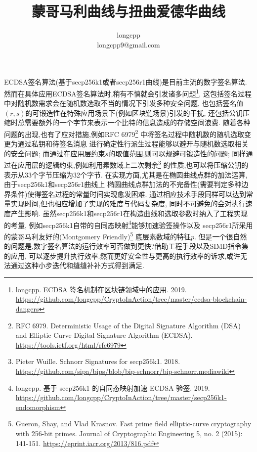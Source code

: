 \documentclass{article}
\begin{document}
\title{蒙哥马利曲线与扭曲爱德华曲线}
\author{longcpp \\ \small{longcpp9@gmail.com}}

\maketitle

ECDSA签名算法(基于secp256k1或者secp256r1曲线)是目前主流的数字签名算法.
然而在具体应用ECDSA签名算法时,稍有不慎就会引发诸多问题\footnote{
longcpp. ECDSA 签名机制在区块链领域中的应⽤. 2019.
\url{https://github.com/longcpp/CryptoInAction/tree/master/ecdsa-blockchain-dangers}},
这包括签名过程中对随机数需求会在随机数选取不当的情况下引发多种安全问题,
也包括签名值$(r,s)$的可锻造性在特殊应用场景下(例如区块链场景)引发的干扰,
还包括公钥压缩时总需要额外的一个字节来表示一个比特的信息造成的存储空间浪费.
随着各种问题的出现,也有了应对措施,例如RFC 6979\footnote{
RFC 6979. 
Deterministic Usage of the Digital Signature Algorithm (DSA) and Elliptic Curve Digital Signature Algorithm (ECDSA).
\url{https://tools.ietf.org/html/rfc6979}}
中将签名过程中随机数的随机选取变更为通过私钥和待签名消息
进行确定性行派生过程能够以避开与随机数选取相关的安全问题;
而通过在应用层约束$s$的取值范围,则可以规避可锻造性的问题;
同样通过在应用层的逻辑约束,例如利用素数域上二次剩余\footnote{
Pieter Wuille. Schnorr Signatures for secp256k1. 2018.
\url{https://github.com/sipa/bips/blob/bip-schnorr/bip-schnorr.mediawiki}}
的性质,也可以将压缩公钥的表示从33个字节压缩为32个字节.
在实现方面,尤其是在椭圆曲线点群的加法运算,由于secp256k1和secp256r1曲线上
椭圆曲线点群加法的不完备性(需要判定多种边界条件)使得签名过程的常量时间实现愈发困难.
通过相应技术手段同样可以达到常量实现时间,但也相应增加了实现的难度与代码复杂度,
同时不可避免的会对执行速度产生影响.
虽然secp256k1和secp256r1在构造曲线和选取参数时纳入了工程实现的考量,
例如secp256k1自带的自同态映射\footnote{
longcpp. 基于 secp256k1 的⾃同态映射加速 ECDSA 验签. 2019.
\url{https://github.com/longcpp/CryptoInAction/tree/master/secp256k1-endomorphism}
}能够加速验签操作以及
secp256r1所采用的蒙哥马利友好的(Montgomery Friendly)\footnote{
Gueron, Shay, and Vlad Krasnov. 
Fast prime field elliptic-curve cryptography with 256-bit primes. 
Journal of Cryptographic Engineering 5, no. 2 (2015): 141-151.
\url{https://eprint.iacr.org/2013/816.pdf}}
底层素数域的特征$p$.
但是一个很自然的问题是,数字签名算法的运行效率可否做到更快?借助工程手段以及SIMD指令集的应用,
可以逐步提升执行效率.然而更好安全性与更高的执行效率的诉求,或许无法通过这种小步迭代和缝缝补补方式得到满足.
\end{document}
